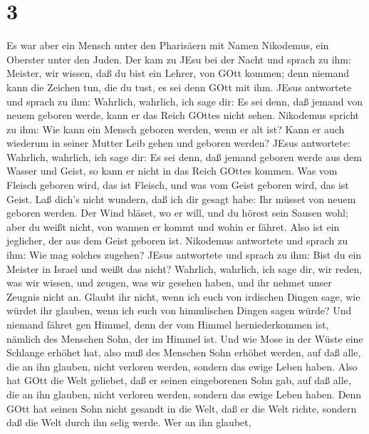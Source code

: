 \hypertarget{section-2}{%
\section{3}\label{section-2}}

 Es war aber ein Mensch unter den Pharisäern mit Namen
Nikodemus, ein Oberster unter den Juden.  Der kam zu JEsu
bei der Nacht und sprach zu ihm: Meister, wir wissen, daß du bist ein
Lehrer, von GOtt kommen; denn niemand kann die Zeichen tun, die du tust,
es sei denn GOtt mit ihm.  JEsus antwortete und sprach zu
ihm: Wahrlich, wahrlich, ich sage dir: Es sei denn, daß jemand von neuem
geboren werde, kann er das Reich GOttes nicht sehen. 
Nikodemus spricht zu ihm: Wie kann ein Mensch geboren werden, wenn er
alt ist? Kann er auch wiederum in seiner Mutter Leib gehen und geboren
werden?  JEsus antwortete: Wahrlich, wahrlich, ich sage dir:
Es sei denn, daß jemand geboren werde aus dem Wasser und Geist, so kann
er nicht in das Reich GOttes kommen.  Was vom Fleisch
geboren wird, das ist Fleisch, und was vom Geist geboren wird, das ist
Geist.  Laß dich's nicht wundern, daß ich dir gesagt habe:
Ihr müsset von neuem geboren werden.  Der Wind bläset, wo er
will, und du hörest sein Sausen wohl; aber du weißt nicht, von wannen er
kommt und wohin er fähret. Also ist ein jeglicher, der aus dem Geist
geboren ist.  Nikodemus antwortete und sprach zu ihm: Wie
mag solches zugehen?  JEsus antwortete und sprach zu ihm:
Bist du ein Meister in Israel und weißt das nicht? 
Wahrlich, wahrlich, ich sage dir, wir reden, was wir wissen, und zeugen,
was wir gesehen haben, und ihr nehmet unser Zeugnis nicht an.
 Glaubt ihr nicht, wenn ich euch von irdischen Dingen sage,
wie würdet ihr glauben, wenn ich euch von himmlischen Dingen sagen
würde?  Und niemand fähret gen Himmel, denn der vom Himmel
herniederkommen ist, nämlich des Menschen Sohn, der im Himmel ist.
 Und wie Mose in der Wüste eine Schlange erhöhet hat, also
muß des Menschen Sohn erhöhet werden,  auf daß alle, die an
ihn glauben, nicht verloren werden, sondern das ewige Leben haben.
 Also hat GOtt die Welt geliebet, daß er seinen
eingeborenen Sohn gab, auf daß alle, die an ihn glauben, nicht verloren
werden, sondern das ewige Leben haben.  Denn GOtt hat
seinen Sohn nicht gesandt in die Welt, daß er die Welt richte, sondern
daß die Welt durch ihn selig werde.  Wer an ihn glaubet,
